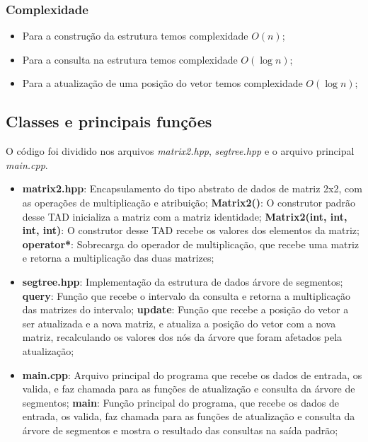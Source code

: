\documentclass{article}
\begin{document}
\subsubsection*{Complexidade}
\begin{itemize}
    \item Para a construção da estrutura temos complexidade $O(n)$;
    \item Para a consulta na estrutura temos complexidade $O(\log n)$;
    \item Para a atualização de uma posição do vetor temos complexidade $O(\log n)$;
\end{itemize}


\subsection{Classes e principais funções}
O código foi dividido nos arquivos \emph{matrix2.hpp}, \emph{segtree.hpp} e o arquivo principal \emph{main.cpp}.
\begin{itemize}
    \item \textbf{matrix2.hpp}: Encapsulamento do tipo abstrato de dados de matriz 2x2, com as operações de multiplicação e atribuição;
        \subitem \textbf{Matrix2()}: O construtor padrão desse TAD inicializa a matriz com a matriz identidade;
        \subitem \textbf{Matrix2(int, int, int, int)}: O construtor desse TAD recebe os valores dos elementos da matriz;
        \subitem \textbf{operator*}: Sobrecarga do operador de multiplicação, que recebe uma matriz e retorna a multiplicação das duas matrizes; 

    \item \textbf{segtree.hpp}: Implementação da estrutura de dados árvore de segmentos;
        \subitem \textbf{query}: Função que recebe o intervalo da consulta e retorna a multiplicação das matrizes do intervalo;
        \subitem \textbf{update}: Função que recebe a posição do vetor a ser atualizada e a nova matriz, e atualiza a posição do vetor com a nova matriz, recalculando os valores dos nós da árvore que foram afetados pela atualização;

    \item \textbf{main.cpp}: Arquivo principal do programa que recebe os dados de entrada, os valida, e faz chamada para as funções de atualização e consulta da árvore de segmentos;
        \subitem \textbf{main}: Função principal do programa, que recebe os dados de entrada, os valida, faz chamada para as funções de atualização e consulta da árvore de segmentos e mostra o resultado das consultas na saída padrão;
    
\end{itemize}
\end{document}
